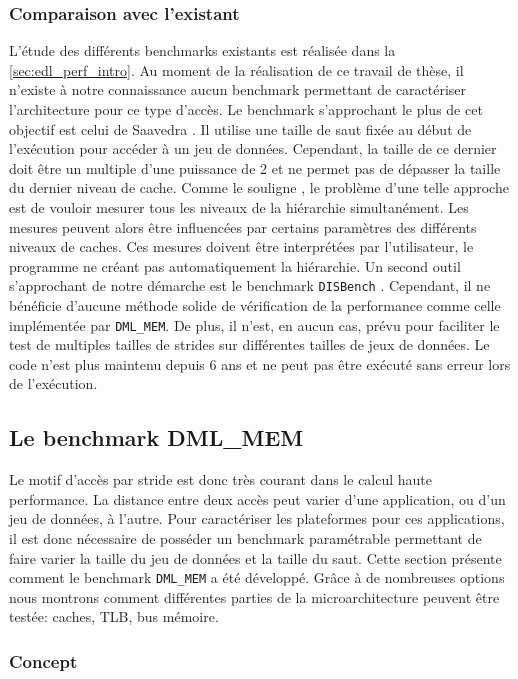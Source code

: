     \subsubsection{Comparaison avec l'existant}
        L'étude des différents benchmarks existants est réalisée dans la \autoref{sec:edl_perf_intro}.  Au moment de la réalisation de ce travail de thèse, il n’existe à notre connaissance aucun benchmark permettant de caractériser l’architecture pour ce type d’accès. Le benchmark s’approchant le plus de cet objectif est celui de Saavedra \cite{Saavedra1995}. Il utilise une taille de saut fixée au début de l’exécution pour accéder à un jeu de données. Cependant, la taille de ce dernier doit être un multiple d’une puissance de 2 et ne permet pas de dépasser la taille du dernier niveau de cache. Comme le souligne \cite{Yotov2005}, le problème d’une telle approche est de vouloir mesurer tous les niveaux de la hiérarchie simultanément. Les mesures peuvent alors être influencées par certains paramètres des différents niveaux de caches. Ces mesures doivent être interprétées par l’utilisateur, le programme ne créant pas automatiquement la hiérarchie. Un second outil s'approchant de notre démarche est le benchmark \verb|DISBench| \cite{disbench}. Cependant, il ne bénéficie d'aucune méthode solide de vérification de la performance comme celle implémentée par \verb=DML_MEM=. De plus, il n'est, en aucun cas, prévu pour faciliter le test de multiples tailles de strides sur différentes tailles de jeux de données. Le code n'est plus maintenu depuis 6 ans et ne peut pas être exécuté sans erreur lors de l'exécution.


\subsection{Le benchmark DML\_MEM}
    Le motif d'accès par \gls{stride} est donc très courant dans le calcul haute performance. La distance entre deux accès peut varier d'une application, ou d'un jeu de données, à l'autre. Pour caractériser les plateformes pour ces applications, il est donc nécessaire de posséder un benchmark paramétrable permettant de faire varier la taille du jeu de données et la taille du saut. Cette section présente comment le benchmark \verb=DML_MEM= a été développé. Grâce à de nombreuses options nous montrons comment différentes parties de la microarchitecture peuvent être testée: caches, TLB, bus mémoire.


    \subsubsection{Concept}
        
